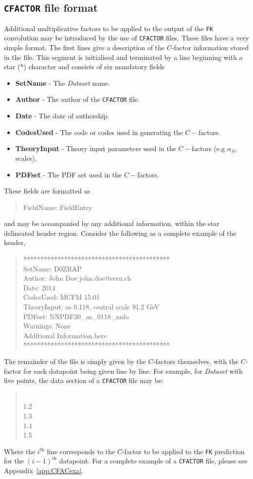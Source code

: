 \documentclass[11pt]{article}
\begin{document}
\subsection{{\tt CFACTOR} file format}
Additional multiplicative factors to be applied to the output of the {\tt FK} convolution may be introduced by the use of {\tt CFACTOR} files. These files have a very simple format. The first lines give a description of the $C$-factor information stored in the file. This segment is initialised and terminated by a line beginning with a star (\mbox{*}) character and consists of six mandatory fields
\begin{itemize}
\item \textbf{SetName} - The \emph{Dataset} name.
\item \textbf{Author} - The author of the {\tt CFACTOR} file.
\item \textbf{Date} - The date of authorship.
\item \textbf{CodesUsed} - The code or codes used in generating the $C-$factors.
\item \textbf{TheoryInput} - Theory input parameters used in the $C-$factors (e.g $\alpha_S$, scales).
\item \textbf{PDFset} - The PDF set used in the $C-$factors.
\end{itemize}
These fields are formatted as 
\begin{quotation}
FieldName: FieldEntry
\end{quotation}
and may be accompanied by any additional information, within the star delineated header region. Consider the following as a complete example of the header,
\begin{quotation}\noindent
*******************************************\\
SetName: D0ZRAP\\
Author: John Doe john.doe@cern.ch \\
Date: 2014\\
CodesUsed: MCFM 15.01\\
TheoryInput: as 0.118, central scale 91.2 GeV\\
PDFset: NNPDF30\_as\_0118\_nnlo\\
Warnings: None\\
Additional Information here\\
*******************************************
\end{quotation}
The remainder of the file is simply given by the $C$-factors themselves, with the $C$-factor for each datapoint being given line by line. For example, for \emph{Dataset} with five points, the data section of a {\tt CFACTOR} file may be:
\begin{quotation}\\
 1.2\\
 1.3\\
 1.4\\
 1.5
\end{quotation}
Where the $i^{\text{th}}$ line corresponds to the $C$-factor to be applied to the {\tt FK} prediction for the $(i-1)^{\text{th}}$ datapoint.
For a complete example of a {\tt CFACTOR} file, please see Appendix~\ref{app:CFACexa}.
\end{document}
